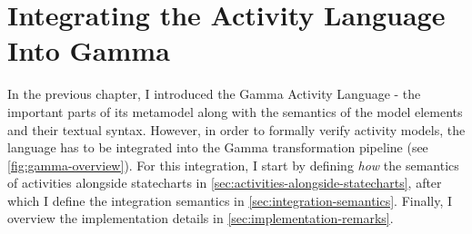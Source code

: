 \chapter{Integrating the Activity Language Into Gamma}\label{ch:activiy_verification}

In the previous chapter, I introduced the Gamma Activity Language - the important parts of its metamodel along with the semantics of the model elements and their textual syntax. However, in order to formally verify activity models, the language has to be integrated into the Gamma transformation pipeline (see \autoref{fig:gamma-overview}). For this integration, I start by defining \emph{how} the semantics of activities alongside statecharts in \autoref{sec:activities-alongside-statecharts}, after which I define the integration semantics in \autoref{sec:integration-semantics}. Finally, I overview the implementation details in \autoref{sec:implementation-remarks}. 




